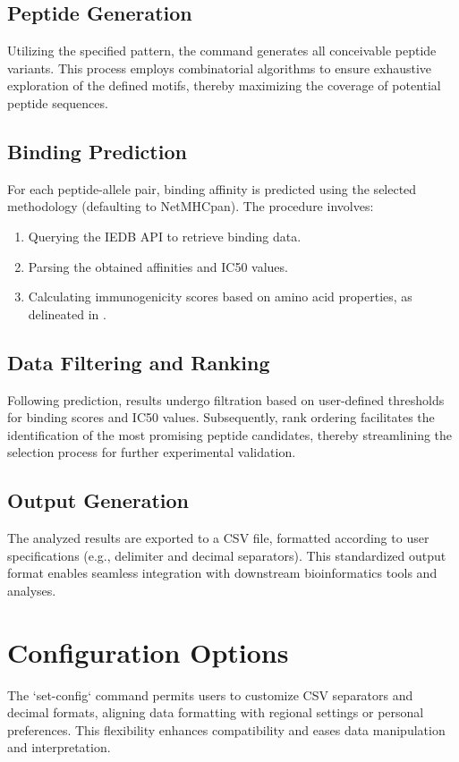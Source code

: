 \documentclass{article}
\begin{document}
\subsection{Peptide Generation}
Utilizing the specified pattern, the command generates all conceivable peptide variants. This process employs combinatorial algorithms to ensure exhaustive exploration of the defined motifs, thereby maximizing the coverage of potential peptide sequences.

\subsection{Binding Prediction}
For each peptide-allele pair, binding affinity is predicted using the selected methodology (defaulting to NetMHCpan). The procedure involves:
\begin{enumerate}
    \item Querying the IEDB API to retrieve binding data.
    \item Parsing the obtained affinities and IC50 values.
    \item Calculating immunogenicity scores based on amino acid properties, as delineated in \cite{smith2020immunogenicity}.
\end{enumerate}

\subsection{Data Filtering and Ranking}
Following prediction, results undergo filtration based on user-defined thresholds for binding scores and IC50 values. Subsequently, rank ordering facilitates the identification of the most promising peptide candidates, thereby streamlining the selection process for further experimental validation.

\subsection{Output Generation}
The analyzed results are exported to a CSV file, formatted according to user specifications (e.g., delimiter and decimal separators). This standardized output format enables seamless integration with downstream bioinformatics tools and analyses.

\section{Configuration Options}
The `set-config` command permits users to customize CSV separators and decimal formats, aligning data formatting with regional settings or personal preferences. This flexibility enhances compatibility and eases data manipulation and interpretation.
\end{document}

